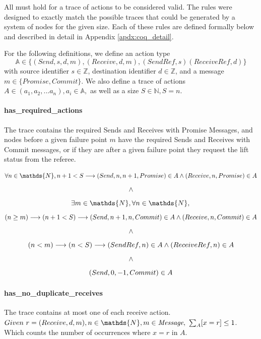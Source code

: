 \documentclass[runningheads]{llncs}
\newcommand{\action}{\mathds{A}}
\begin{document}
All must hold for a trace of actions to be considered valid. The rules were designed to exactly match the possible traces that could be generated by a system of nodes for the given size. Each of these rules are defined formally below and described in detail in Appendix \ref{apdx:coq_detail}.

For the following definitions, we define an action type 
$$\action \in \{(Send, s, d, m), (Receive, d, m), (SendRef, s) (ReceiveRef, d)\}$$
with source identifier $s \in \mathds{Z}$, destination identifier $d \in \mathds{Z}$, and a message $m \in \{Promise, Commit\}$. We also define a trace of actions 
$A \in (a_1, a_2, ... a_n), a_i \in \action,$ as well as a size $S \in \mathds{N}, S = n.$

\paragraph{has\_required\_actions} The trace contains the required Sends and Receives with Promise Messages, and nodes before a given failure point $m$ have the required Sends and Receives with Commit messages, or if they are after a given failure point they request the lift status from the referee.

$$
   \forall n \in \mathds{N}, n + 1 < S \longrightarrow \\
   (Send, n, n+1, Promise) \in A \wedge (Receive, n, Promise) \in A\ \\
$$
$$ \wedge \\ $$
$$
   \exists m \in \mathds{N}, \forall n \in \mathds{N}, \\
$$
$$
   (n \ge m) \longrightarrow (n + 1 < S) \longrightarrow \\
   (Send, n+1, n, Commit) \in A \wedge (Receive, n, Commit) \in A\ \\
$$
$$ \wedge \\ $$
$$
   (n < m) \longrightarrow (n < S) \longrightarrow \\
   (SendRef, n) \in A \wedge (ReceiveRef, n) \in A\ \\
$$
$$ \wedge \\ $$
$$
    (Send, 0, -1, Commit) \in A \\
$$

\paragraph{has\_no\_duplicate\_receives}
The trace contains at most one of each receive action. 
$Given\ r = (Receive, d, m), n \in \mathds{N}, m \in \emph{Message},\ \sum_{A}[x=r] \le 1$. Which counts the number of occurrences where $x=r$ in $A$. 
\end{document}
